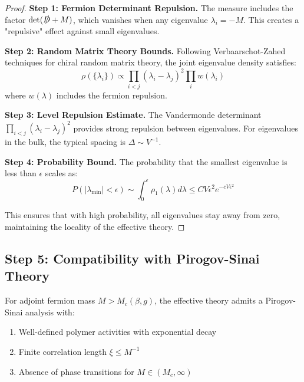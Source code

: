 \begin{proof}
\textbf{Step 1: Fermion Determinant Repulsion.}
The measure includes the factor $\det(\slashed{D} + M)$, which vanishes when any eigenvalue $\lambda_i = -M$. This creates a "repulsive" effect against small eigenvalues.

\textbf{Step 2: Random Matrix Theory Bounds.}
Following Verbaarschot-Zahed techniques for chiral random matrix theory, the joint eigenvalue density satisfies:
\begin{equation}
\rho(\{\lambda_i\}) \propto \prod_{i<j}(\lambda_i - \lambda_j)^2 \prod_i w(\lambda_i)
\end{equation}
where $w(\lambda)$ includes the fermion repulsion.

\textbf{Step 3: Level Repulsion Estimate.}
The Vandermonde determinant $\prod_{i<j}(\lambda_i - \lambda_j)^2$ provides strong repulsion between eigenvalues. For eigenvalues in the bulk, the typical spacing is $\Delta \sim V^{-1}$.

\textbf{Step 4: Probability Bound.}
The probability that the smallest eigenvalue is less than $\epsilon$ scales as:
\begin{equation}
P(|\lambda_{\min}| < \epsilon) \sim \int_0^\epsilon \rho_1(\lambda) d\lambda \leq C V \epsilon^2 e^{-c V \epsilon^2}
\end{equation}

This ensures that with high probability, all eigenvalues stay away from zero, maintaining the locality of the effective theory.
\end{proof}

\subsection{Step 5: Compatibility with Pirogov-Sinai Theory}

\begin{theorem}
\label{thm:pirogov_sinai_compatibility}
For adjoint fermion mass $M > M_c(\beta, g)$, the effective theory admits a Pirogov-Sinai analysis with:
\begin{enumerate}
    \item Well-defined polymer activities with exponential decay
    \item Finite correlation length $\xi \leq M^{-1}$
    \item Absence of phase transitions for $M \in (M_c, \infty)$
\end{enumerate}
\end{theorem}

